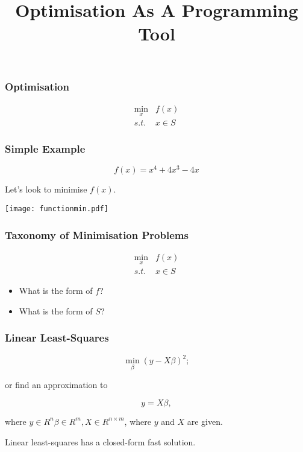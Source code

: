 
\title{Optimisation As A Programming Tool}

\frame{\maketitle}

\begin{frame}[fragile]
\frametitle{Optimisation}

\begin{align*}
\min_x & f(x)\\
s.t.\,\,  &x \in S
\end{align*}

\end{frame}

\begin{frame}[fragile]
\frametitle{Simple Example}

\[
f(x) = x^4+4x^3-4x
\]

Let's look to minimise $f(x)$.

\end{frame}

\begin{frame}[fragile]

\centering
\texttt{[image: functionmin.pdf]}

\end{frame}

\begin{frame}[fragile]
\frametitle{Taxonomy of Minimisation Problems}
\begin{align*}
\min_x & f(x)\\
s.t.\,\,  &x \in S
\end{align*}

\begin{itemize}
\item What is the form of $f$?
\item What is the form of $S$?
\end{itemize}
\end{frame}

\begin{frame}[fragile]
\frametitle{Linear Least-Squares}

\[
\min_{\beta} (y - X\beta)^2;
\]

or find an approximation to

\[
y = X \beta,
\]

where $y \in R^{n} \beta \in R^m, X \in R^{n \times m}$, where $y$ and $X$ are given.

Linear least-squares has a closed-form \alert{fast} solution.

\end{frame}

